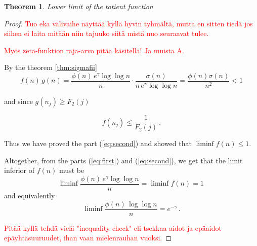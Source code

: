 \documentclass{article}
\theoremstyle{definition}
\newtheorem{theorem}[subsubsection]{Theorem}
\begin{document}
\begin{theorem}{\emph{Lower limit of the totient function}}
\begin{proof}
\textcolor{red}{Tuo eka välivaihe näyttää kyllä hyvin tyhmältä, mutta en sitten tiedä jos siihen ei laita mitään niin tajuuko siitä mistä nuo seuraavat tulee.}

\textcolor{red}{Myös zeta-funktion raja-arvo pitää käsitellä! Ja muista A.}

By the theorem \ref{thm:sigmafii}
\begin{equation*}
    f(n)\,g(n) = \frac{\phi(n)\,e^\gamma \log\log n}{n} \cdot \frac{\sigma(n)}{n\,e^\gamma \log\log n} = \frac{\phi(n)\sigma(n)}{n^2}<1
\end{equation*}

and since $g(n_j) \geq F_2(j)$

\begin{equation*}
    f(n_j)\leq \frac{1}{F_2(j)}\,.
\end{equation*}

Thus we have proved the part (\ref{eq:second}) and showed that $\liminf{f(n)\leq 1}$.

Altogether, from the parts (\ref{eq:first}) and (\ref{eq:second}), we get that the limit inferior of $f(n)$ must be
\begin{equation*}
    \liminf{\frac{\phi(n)\,e^\gamma \log\log n}{n}}=\liminf{f(n)}=1\,
\end{equation*}
and equivalently
\begin{equation*}
    \liminf{\frac{\phi(n)\,\log\log n}{n}}=e^{-\gamma}\,.
\end{equation*}

\textcolor{red}{Pitää kyllä tehdä vielä "inequality check" eli tsekkaa aidot ja epäaidot epäyhtäsuuruudet, ihan vaan mielenrauhan vuoksi.}

\end{proof}

\end{theorem}
\end{document}
